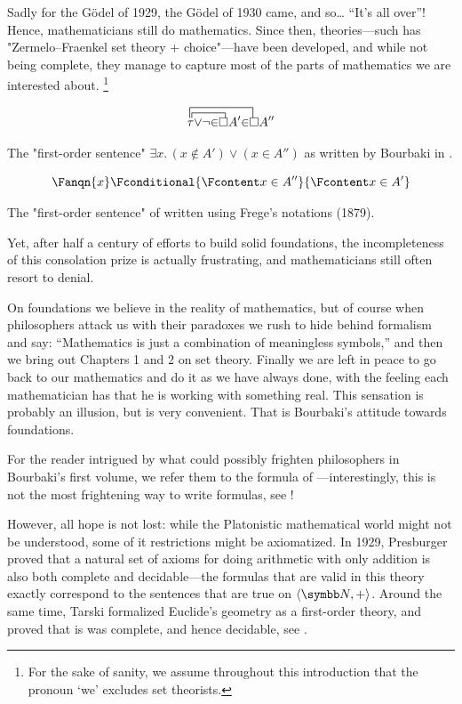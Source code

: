 Sadly for the Gödel of 1929, the Gödel of 1930 came, and so… ``It's all over''!
Hence, mathematicians still do mathematics. Since then, theories---such has
"Zermelo–Fraenkel set theory + choice"---have been developed, and while not being complete, they 
manage to capture most of the parts of mathematics we are interested about.%
\footnote{For the sake of sanity, we assume
throughout this introduction that the pronoun `we' excludes set theorists.}
\begin{marginfigure}
	\centering
	\[
	\contraction{}{\tau\,}{{\vee} {\neg} {\in}}{\!\square}
	\contraction[2ex]{}{\tau\!}{{\vee} {\neg} {\in} \square A' {\in}}{\square}
	\tau {\vee} {\neg} {\in} \square A' {\in} \square A''
	\]
	\caption{\AP\label{fig:intro-bourbaki}
	The "first-order sentence" $\exists x.\, (x \not\in A') \lor (x \in A'')$
	as written by Bourbaki in \cite[\S~1]{Bourbaki2006Logique}.
	}
\end{marginfigure}
\begin{marginfigure}
	\centering
	\[
		\Fanqn{x}\Fconditional{\Fcontent x \in A''}{\Fcontent x \in A'}
	\]
	\caption{\AP\label{fig:intro-frege}
		The "first-order sentence" of 
		written using Frege's notations (1879).
	}
\end{marginfigure}
Yet, after half a century of efforts to build solid foundations,
the incompleteness of this consolation prize is actually frustrating,
and mathematicians still often resort to denial.
\begin{displayquote}
	On foundations we believe in the reality of mathematics, but of course when philosophers attack us with their paradoxes we rush to hide behind formalism and say: ``Mathematics is just a combination of meaningless symbols,'' and then we bring out Chapters 1 and 2 on set theory. Finally we are left in peace to go back to our mathematics and do it as we have always done, with the feeling each mathematician has that he is working with something real.
	This sensation is probably an illusion, but is very convenient. That is Bourbaki's attitude towards foundations.	
\end{displayquote}
For the reader intrigued by what could possibly frighten philosophers in Bourbaki's first volume,
we refer them to the formula of ---interestingly, this is not the most 
frightening way to write formulas, see !

However, all hope is not lost: while the Platonistic mathematical world might
not be understood, some of it restrictions might be axiomatized.
In 1929, Presburger proved that a natural set of axioms for doing
arithmetic with only addition is also both complete and decidable---the formulas
that are valid in this theory exactly correspond to the sentences that are true on $\tup{\N,+}$.
Around the same time, Tarski formalized Euclide's geometry as a first-order theory, and proved
that is was complete, and hence decidable, see \cite{TarskiGivant1999Geometry}.

